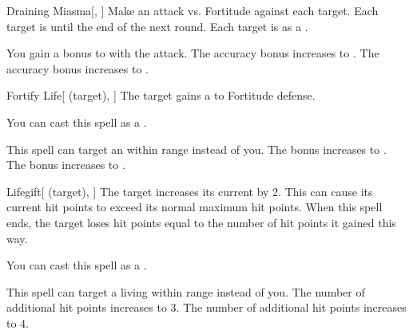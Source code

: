 \lowercase{\hypertarget{spell:Draining Miasma}{}}\label{spell:Draining Miasma}
\begin{freeability}[Rank 1]{\hypertarget{spell:Draining Miasma}{Draining Miasma}}[, ]
Make an attack vs. Fortitude against each target.
\hit Each target is  until the end of the next round.
\crit Each target is  as a .

\rankline
{} You gain a  bonus to  with the attack.
 The accuracy bonus increases to .
 The accuracy bonus increases to .

\end{freeability}
\vspace{0.25em}



\lowercase{\hypertarget{spell:Fortify Life}{}}\label{spell:Fortify Life}
\begin{attuneability}[Rank 1]{\hypertarget{spell:Fortify Life}{Fortify Life}}[ (target), ]
The target gains a   to Fortitude defense.

You can cast this spell as a .

\rankline
{} This spell can target an  within \rngmed range instead of you.
 The bonus increases to .
 The bonus increases to .

\end{attuneability}
\vspace{0.25em}



\lowercase{\hypertarget{spell:Lifegift}{}}\label{spell:Lifegift}
\begin{attuneability}[Rank 1]{\hypertarget{spell:Lifegift}{Lifegift}}[ (target), ]
The target increases its current  by 2.
This can cause its current hit points to exceed its normal maximum hit points.
When this spell ends, the target loses hit points equal to the number of hit points it gained this way.

You can cast this spell as a .

\rankline
{} This spell can target a living  within \rngmed range instead of you.
 The number of additional hit points increases to 3.
 The number of additional hit points increases to 4.

\end{attuneability}
\vspace{0.25em}



